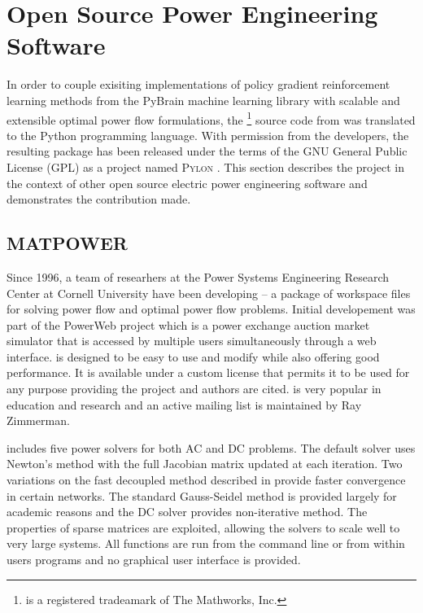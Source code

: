 \newpage
\section{Open Source Power Engineering Software}
\label{sec:oss}
In order to couple exisiting implementations of policy gradient reinforcement
learning methods from the PyBrain machine learning library with scalable and
extensible optimal power flow formulations, the
\matlab\footnote{\matlab is a registered tradeamark of The Mathworks, Inc.}
source code from \matpower was translated to the Python programming language.
With permission from the \matpower developers, the resulting package has been
released under the terms of the GNU General Public License (GPL) as a project
named \textsc{Pylon} \cite{lincoln:pyreto}.   This section describes the
project in the context of other open source electric power engineering software and
demonstrates the contribution made.

\subsection{MATPOWER}
Since 1996, a team of researhers at the Power Systems Engineering Research
Center at Cornell University have been developing \matpower -- a package of
\matlab workspace files for solving power flow and optimal power flow problems.
Initial developement was part of the PowerWeb project which is a power
exchange auction market simulator that is accessed by multiple users
simultaneously through a web interface.  \matpower is designed to be easy to use
and modify while also offering good performance.  It is available under a
custom license that permits it to be used for any purpose providing the project
and authors are cited.  \matpower is very popular in education and research and
an active mailing list is maintained by Ray Zimmerman.

\matpower includes five power solvers for both AC and DC problems.  The default
solver uses Newton's method \cite{tinney:67} with the full Jacobian matrix
updated at each iteration.  Two variations on the fast decoupled method
\cite{stott:74} described in \cite{amerongen:89} provide faster convergence in
certain networks.  The standard Gauss-Seidel method \cite{glimn:57} is provided
largely for academic reasons and the DC solver provides non-iterative
method.  The properties of \matlab sparse matrices are exploited, allowing the
solvers to scale well to very large systems.  All functions are run from the
\matlab command line or from within users programs and no graphical user
interface is provided.


